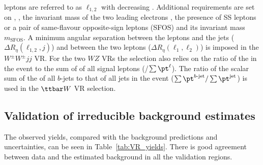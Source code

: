 \begin{table}[htb!]
{leptons are referred to as $\ell_{1,2}$ with decreasing \pt. Additional requirements are set 
on \met, \meff, the invariant mass of the two leading electrons \mee, the presence of SS 
leptons or a pair of same-flavour opposite-sign leptons (SFOS) and its invariant mass $m_\text{SFOS}$. 
A minimum angular separation between the leptons and the jets ($\Delta R_\eta (\ell_{1,2}, j)$) and between the two 
leptons ($\Delta R_\eta (\ell_{1}, \ell_2)$) is imposed in the $W^\pm W^\pm jj$ VR. 
For the two $WZ$ VRs the selection also relies on the ratio of the \met in the event to the sum of \pt of all signal leptons \pt (\met/$\sum{\pt^{\ell}}$). 
The ratio of the scalar sum of the \pt of all $b$-jets to that of all jets in the event 
($\sum \pt^{b{\textrm{-jet}}} / \sum{\pt^{\textrm{jet}}}$) is used in the $\ttbar W$ VR selection.}
\label{tab:VRdef}
\end{table}

\subsection{Validation of irreducible background estimates}
\label{sec:bkg.irred.res}

The observed yields, compared with the background predictions and uncertainties, 
can be seen in Table~\ref{tab:VR_yields}. There is good agreement between data and the estimated background in all
the validation regions. 

